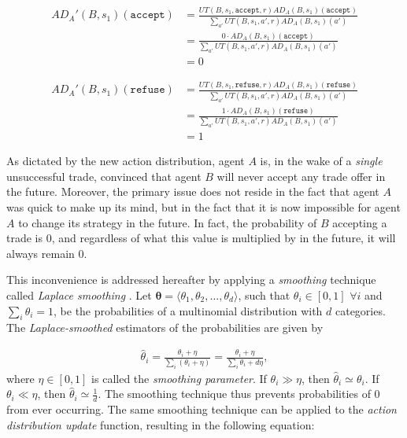 \begin{align*}
    AD_A'(B,s_1)(\texttt{accept}) &=   \frac{UT(B,s_1, \texttt{accept},r) AD_A(B,s_1)(\texttt{accept})}{\sum_{a'} UT(B,s_1,a',r) AD_A(B,s_1)(a')}
    \\&=  \frac{0 \cdot AD_A(B,s_1)(\texttt{accept})}{\sum_{a'} UT(B,s_1,a',r) AD_A(B,s_1)(a')}
    \\&= 0
\end{align*}

\begin{align*}
    AD_A'(B,s_1)(\texttt{refuse}) &=   \frac{UT(B,s_1, \texttt{refuse},r) AD_A(B,s_1)(\texttt{refuse})}{\sum_{a'} UT(B,s_1,a',r) AD_A(B,s_1)(a')}
    \\&=  \frac{1 \cdot AD_A(B,s_1)(\texttt{refuse})}{\sum_{a'} UT(B,s_1,a',r) AD_A(B,s_1)(a')}
    \\&= 1
\end{align*}



As dictated by the new action distribution, agent $A$ is, in the wake of a \textit{single} unsuccessful trade, convinced that agent $B$ will never accept any trade offer in the future. Moreover, the primary issue does not reside in the fact that agent $A$ was quick to make up its mind, but in the fact that it is now impossible for agent $A$ to change its strategy in the future. In fact, the probability of $B$ accepting a trade is 0, and regardless of what this value is multiplied by in the future, it will always remain 0. 

This inconvenience is addressed hereafter by applying a \textit{smoothing} technique called \textit{Laplace smoothing} \cite{laplacesmoothing}. Let $\mathbf{\theta} = \langle \theta_1, \theta_2, ..., \theta_d \rangle$, such that $\theta_i \in [0,1] \,\, \forall i$ and $\sum_{i} \theta_i = 1$, be the probabilities of a multinomial distribution with $d$ categories. The \textit{Laplace-smoothed} estimators of the probabilities are given by

\begin{align}
    \hat{\theta}_i = \frac{\theta_i + \eta}{\sum_i (\theta_i + \eta)} = \frac{\theta_i + \eta}{\sum_i \theta_i + d\eta},
\end{align}
where $\eta \in [0,1]$ is called the \textit{smoothing parameter}. If $\theta_i \gg \eta$, then $\hat{\theta}_i \simeq \theta_i$. If $\theta_i \ll \eta$, then $\hat{\theta}_i \simeq \frac{1}{d}$. The smoothing technique thus prevents probabilities of 0 from ever occurring. The same smoothing technique can be applied to the \textit{action distribution update} function, resulting in the following equation:

